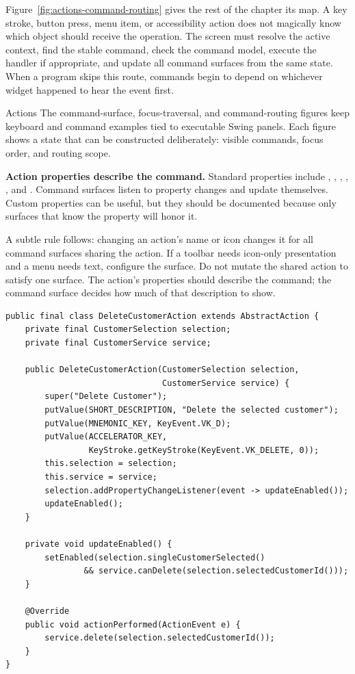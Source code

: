 Figure~\ref{fig:actions-command-routing} gives the rest of the chapter its
map. A key stroke, button press, menu item, or accessibility action does not
magically know which object should receive the operation. The screen must
resolve the active context, find the stable command, check the command model,
execute the handler if appropriate, and update all command surfaces from the same
state. When a program skips this route, commands begin to depend on whichever
widget happened to hear the event first.

\begin{examplebox}{Actions}
The command-surface, focus-traversal, and command-routing figures keep keyboard and command examples tied to executable Swing panels. Each figure shows a state that can be constructed deliberately: visible commands, focus order, and routing scope.
\end{examplebox}

\textbf{Action properties describe the command.} Standard properties include , , , , , and . Command surfaces listen to property changes and update themselves. Custom properties can be useful, but they should be documented because only surfaces that know the property will honor it.

A subtle rule follows: changing an action's name or icon changes it for all command surfaces sharing the action. If a toolbar needs icon-only presentation and a menu needs text, configure the surface. Do not mutate the shared action to satisfy one surface. The action's properties should describe the command; the command surface decides how much of that description to show.

\begin{lstlisting}[caption={A domain-aware action with centralized enablement.}]
public final class DeleteCustomerAction extends AbstractAction {
    private final CustomerSelection selection;
    private final CustomerService service;

    public DeleteCustomerAction(CustomerSelection selection,
                                CustomerService service) {
        super("Delete Customer");
        putValue(SHORT_DESCRIPTION, "Delete the selected customer");
        putValue(MNEMONIC_KEY, KeyEvent.VK_D);
        putValue(ACCELERATOR_KEY,
                 KeyStroke.getKeyStroke(KeyEvent.VK_DELETE, 0));
        this.selection = selection;
        this.service = service;
        selection.addPropertyChangeListener(event -> updateEnabled());
        updateEnabled();
    }

    private void updateEnabled() {
        setEnabled(selection.singleCustomerSelected()
                && service.canDelete(selection.selectedCustomerId()));
    }

    @Override
    public void actionPerformed(ActionEvent e) {
        service.delete(selection.selectedCustomerId());
    }
}
\end{lstlisting}

